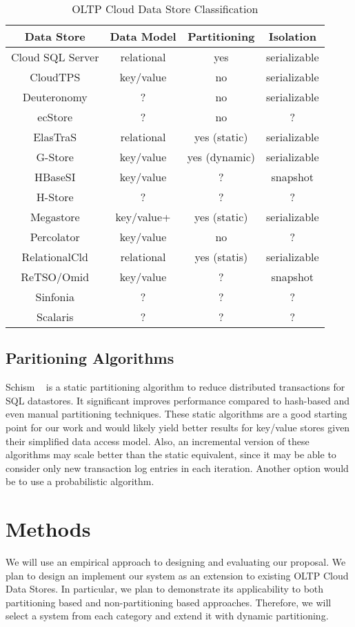\documentclass[10pt,final,journal]{IEEEtran}
\begin{document}
\begin{table}[!t]
\renewcommand{\arraystretch}{1.3}
\caption{OLTP Cloud Data Store Classification}
\label{classification}
\centering
\begin{tabular}{|c|c|c|c|}
\hline
\bfseries Data Store  & \bfseries Data Model & \bfseries  Partitioning & \bfseries Isolation \\
\hline
\hline
Cloud SQL Server & relational & yes & serializable \\
CloudTPS & key/value & no & serializable \\
Deuteronomy & ? & no &serializable \\
ecStore & ? & no & ? \\
ElasTraS & relational & yes (static) & serializable \\
G-Store & key/value & yes (dynamic) & serializable \\
HBaseSI & key/value & ? & snapshot \\
H-Store & ? & ? & ? \\
Megastore & key/value+ & yes (static) & serializable \\
Percolator & key/value & no & ? \\
RelationalCld & relational & yes (statis) & serializable \\
ReTSO/Omid & key/value & ? & snapshot \\
Sinfonia & ? & ? & ? \\
Scalaris & ? & ? & ? \\
\hline
\end{tabular}
\end{table}

\subsection{Paritioning Algorithms}
Schism ~\cite{Curino:2010:SWA:1920841.1920853} is a static partitioning algorithm to reduce distributed transactions for SQL datastores. It significant improves performance compared to hash-based and even manual partitioning techniques. These static algorithms are a good starting point for our work and would likely yield better results for key/value stores given their simplified data access model. Also, an incremental version of these algorithms may scale better than the static equivalent, since it may be able to consider only new transaction log entries in each iteration. Another option would be to use a probabilistic algorithm.



\section{Methods}
We will use an empirical approach to designing and evaluating our proposal. We plan to design an implement our system as an extension to existing OLTP Cloud Data Stores. In particular, we plan to demonstrate its applicability to both partitioning based and non-partitioning based approaches. Therefore, we will select a system from each category and extend it with dynamic partitioning.
\end{document}
